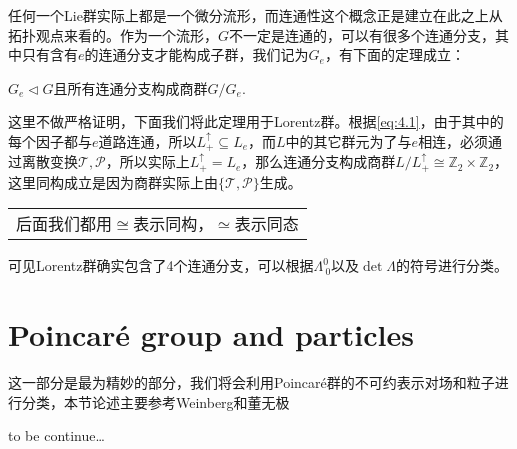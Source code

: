 任何一个Lie群实际上都是一个微分流形，而连通性这个概念正是建立在此之上从拓扑观点来看的。作为一个流形，$G$不一定是连通的，可以有很多个连通分支，其中只有含有$e$的连通分支才能构成子群，我们记为$G_e$，有下面的定理成立：
\begin{theorem}
	$G_e\lhd G$且所有连通分支构成商群$G/G_e$.
\end{theorem}
这里不做严格证明，下面我们将此定理用于Lorentz群。根据\ref{eq:4.1}，由于其中的每个因子都与$e$道路连通，所以$L^\uparrow_+\subseteq L_e$，而$L$中的其它群元为了与$e$相连，必须通过离散变换$\mathcal{T},\mathcal{P}$，所以实际上$L^\uparrow_+=L_e$，那么连通分支构成商群$L/L^\uparrow_+\cong \mathbb{Z}_2\times\mathbb{Z}_2$，这里同构成立是因为商群实际上由$\{\mathcal{T},\mathcal{P}\}$生成。
\begin{margintable}\footnotesize 
	\begin{tabularx}{\marginparwidth}{|X}
		后面我们都用$\cong$表示同构，$\simeq$表示同态
	\end{tabularx}
\end{margintable}

可见Lorentz群确实包含了4个连通分支，可以根据$\Lambda^0_{\ 0}$以及$\det \Lambda$的符号进行分类。
\section{Poincar\'e group and particles}
这一部分是最为精妙的部分，我们将会利用Poincar\'e群的不可约表示对场和粒子进行分类，本节论述主要参考Weinberg\cite{Weinberg}和董无极\cite{WKT}


to be continue\ldots

